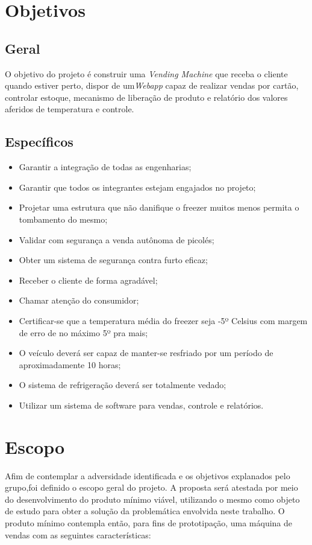 \section{Objetivos}

\subsection{Geral}

O objetivo do projeto é construir uma \textit{Vending Machine} que receba o cliente quando estiver perto, dispor de um\textit{Webapp} capaz de realizar vendas por cartão, controlar estoque, mecanismo de liberação de produto e relatório dos valores aferidos de temperatura e controle.  

\subsection{Específicos}

\begin{itemize}
\item Garantir a integração de todas as engenharias;
\item Garantir que todos os integrantes estejam engajados no projeto;
\item Projetar uma estrutura que não danifique o freezer muitos menos permita o tombamento do mesmo;
\item Validar com segurança a venda autônoma de picolés;
\item Obter um sistema de segurança contra furto eficaz;
\item Receber o cliente de forma agradável;
\item Chamar atenção do consumidor;
\item Certificar-se que a temperatura média do freezer seja -5º Celsius com margem de erro de no máximo 5º pra mais;
\item O veículo deverá ser capaz de manter-se resfriado por um período de aproximadamente 10 horas;
\item O sistema de refrigeração deverá ser totalmente vedado;
\item Utilizar um sistema de software para vendas, controle e relatórios.
\end{itemize}


\section{Escopo}
Afim de contemplar a adversidade identificada e os objetivos explanados pelo grupo,foi definido o escopo geral do projeto. A proposta será atestada por meio do desenvolvimento do produto mínimo viável, utilizando o mesmo como objeto de estudo para obter a solução da problemática envolvida neste trabalho. O produto mínimo contempla então, para fins de prototipação, uma máquina de vendas com as seguintes características:

